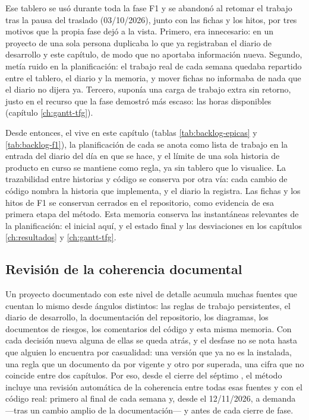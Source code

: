 Ese tablero se usó durante toda la fase F1 y se abandonó al retomar el trabajo tras la pausa del traslado (03/10/2026), junto con las fichas y los hitos, por tres motivos que la propia fase dejó a la vista.
Primero, era innecesario: en un proyecto de una sola persona duplicaba lo que ya registraban el diario de desarrollo y este capítulo, de modo que no aportaba información nueva.
Segundo, metía ruido en la planificación: el trabajo real de cada semana quedaba repartido entre el tablero, el diario y la memoria, y mover fichas no informaba de nada que el diario no dijera ya.
Tercero, suponía una carga de trabajo extra sin retorno, justo en el recurso que la fase demostró más escaso: las horas disponibles (capítulo \ref{ch:gantt-tfg}).

Desde entonces, el  vive en este capítulo (tablas \ref{tab:backlog-epicas} y \ref{tab:backlog-f1}), la planificación de cada  se anota como lista de trabajo en la entrada del diario del día en que se hace, y el límite de una sola historia de producto en curso se mantiene como regla, ya sin tablero que lo visualice.
La trazabilidad entre historias y código se conserva por otra vía: cada cambio de código nombra la historia que implementa, y el diario la registra.
Las fichas y los hitos de F1 se conservan cerrados en el repositorio, como evidencia de esa primera etapa del método.
Esta memoria conserva las instantáneas relevantes de la planificación: el  inicial aquí, y el estado final y las desviaciones en los capítulos \ref{ch:resultados} y \ref{ch:gantt-tfg}.

\subsection{Revisión de la coherencia documental}
\label{sec:metodologia-coherencia}

Un proyecto documentado con este nivel de detalle acumula muchas fuentes que cuentan lo mismo desde ángulos distintos: las reglas de trabajo persistentes, el diario de desarrollo, la documentación del repositorio, los diagramas, los documentos de riesgos, los comentarios del código y esta misma memoria.
Con cada decisión nueva alguna de ellas se queda atrás, y el desfase no se nota hasta que alguien lo encuentra por casualidad: una versión que ya no es la instalada, una regla que un documento da por vigente y otro por superada, una cifra que no coincide entre dos capítulos.
Por eso, desde el cierre del séptimo , el método incluye una revisión automática de la coherencia entre todas esas fuentes y con el código real: primero al final de cada semana y, desde el 12/11/2026, a demanda —tras un cambio amplio de la documentación— y antes de cada cierre de fase.

